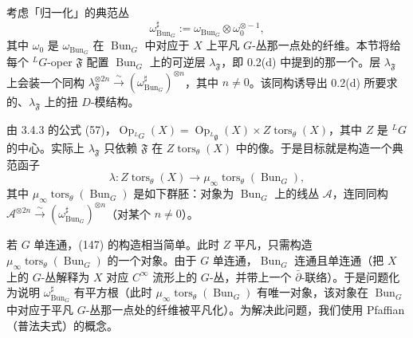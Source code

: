 


 考虑「归一化」的典范丛
\begin{equation}\tag{146}
\omega^{\sharp}_{\operatorname{Bun}_G}:=\omega_{\operatorname{Bun}_G}\otimes\omega_0^{\otimes -1},
\end{equation}
其中 $\omega_0$ 是 $\omega_{\operatorname{Bun}_G}$ 在 $\operatorname{Bun}_G$ 中对应于 $X$ 上平凡 $G$-丛那一点处的纤维。本节将给每个 ${}^{L}G$-oper $\mathfrak{F}$ 配置 $\operatorname{Bun}_G$ 上的可逆层 $\lambda_{\mathfrak{F}}$，即 0.2(d) 中提到的那一个。层 $\lambda_{\mathfrak{F}}$ 上会装一个同构 $\lambda_{\mathfrak{F}}^{\otimes 2n}\xrightarrow{\ \sim\ }(\omega^{\sharp}_{\operatorname{Bun}_G})^{\otimes n}$，其中 $n\ne 0$。该同构诱导出 0.2(d) 所要求的、$\lambda_{\mathfrak{F}}$ 上的扭 $D$-模结构。

由 3.4.3 的公式 (57)，$\operatorname{Op}_{{}^{L}G}(X)=\operatorname{Op}_{{}^{L}\mathfrak{g}}(X)\times Z\operatorname{tors}_{\theta}(X)$，其中 $Z$ 是 ${}^{L}G$ 的中心。实际上 $\lambda_{\mathfrak{F}}$ 只依赖 $\mathfrak{F}$ 在 $Z\operatorname{tors}_{\theta}(X)$ 中的像。于是目标就是构造一个典范函子
\begin{equation}\tag{147}
\lambda:Z\operatorname{tors}_{\theta}(X)\to\mu_\infty\operatorname{tors}_{\theta}(\operatorname{Bun}_G),
\end{equation}
其中 $\mu_\infty\operatorname{tors}_{\theta}(\operatorname{Bun}_G)$ 是如下群胚：对象为 $\operatorname{Bun}_G$ 上的线丛 $\mathcal{A}$，连同同构 $\mathcal{A}^{\otimes 2n}\xrightarrow{\ \sim\ }(\omega^{\sharp}_{\operatorname{Bun}_G})^{\otimes n}$（对某个 $n\ne 0$）。

 若 $G$ 单连通，(147) 的构造相当简单。此时 $Z$ 平凡，只需构造 $\mu_\infty\operatorname{tors}_{\theta}(\operatorname{Bun}_G)$ 的一个对象。由于 $G$ 单连通，$\operatorname{Bun}_G$ 连通且单连通（把 $X$ 上的 $G$-丛解释为 $X$ 对应 $C^\infty$ 流形上的 $G$-丛，并带上一个 $\bar\partial$-联络）。于是问题化为说明 $\omega^{\sharp}_{\operatorname{Bun}_G}$ 有平方根（此时 $\mu_\infty\operatorname{tors}_{\theta}(\operatorname{Bun}_G)$ 有唯一对象，该对象在 $\operatorname{Bun}_G$ 中对应于平凡 $G$-丛那一点处的纤维被平凡化）。为解决此问题，我们使用 Pfaffian（普法夫式）的概念。

